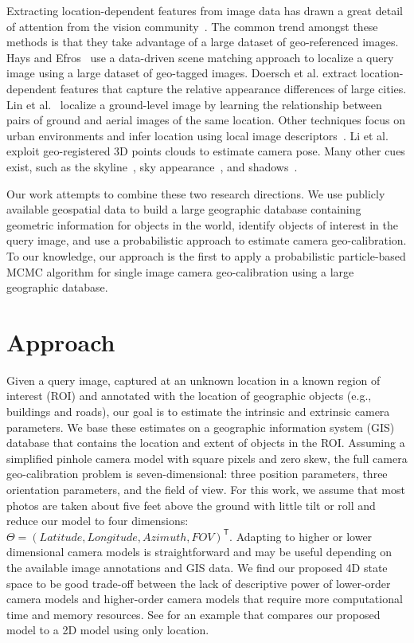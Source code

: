 Extracting location-dependent features from image data has drawn a
great detail of attention from the vision
community~\cite{jacobs07geolocate, jacobs11geolocate,
jacobs08geoorient}. The common trend amongst these methods is that
they take advantage of a large dataset of geo-referenced images. Hays
and Efros~\cite{hays2008im2gps} use a data-driven scene matching
approach to localize a query image using a large dataset of geo-tagged
images.  Doersch et al. extract location-dependent features that
capture the relative appearance differences of large cities.  Lin et
al.~\cite{lin2013cross} localize a ground-level image by learning the
relationship between pairs of ground and aerial images of the same
location. Other techniques focus on urban environments and infer
location using local image
descriptors~\cite{schindler2008detecting,snavely2006photo}. Li et
al.~\cite{li2012worldwide} exploit geo-registered 3D points clouds to
estimate camera pose. Many other cues exist, such as the
skyline~\cite{baatz2012large,ramalingam2009geolocalization}, sky
appearance~\cite{lalonde2010sun,workman2014rainbow}, and
shadows~\cite{junejo2008estimating,wu2010geo}.

Our work attempts to combine these two research directions. We use
publicly available geospatial data to build a large geographic
database containing geometric information for objects in the world,
identify objects of interest in the query image, and use a
probabilistic approach to estimate camera geo-calibration. To our
knowledge, our approach is the first to apply a probabilistic
particle-based MCMC algorithm for single image camera geo-calibration
using a large geographic database. 


\section{Approach}

Given a query image, captured at an unknown location in a known region
of interest (ROI) and annotated with the location of geographic objects
(e.g., buildings and roads), our goal is to estimate the intrinsic and
extrinsic camera parameters.  We base these estimates on a geographic
information system (GIS) database that contains the location and
extent of objects in the ROI.  Assuming a simplified
pinhole camera model
with square pixels and zero skew, the full camera geo-calibration
problem is seven-dimensional: three position parameters, three
orientation parameters, and the field of view. For this work, we
assume that most photos are taken about five feet above the ground
with little tilt or roll and reduce our model to four dimensions:
$\Theta = (Latitude, Longitude, Azimuth, FOV)^\mathsf{T}$. 
%
Adapting to higher or lower dimensional camera models is
straightforward and may be useful depending on the available image
annotations and GIS data.  We find our proposed 4D state space to be
good trade-off between the lack of descriptive power of lower-order
camera models and higher-order camera models that require more
computational time and memory resources. See  for an
example that compares our proposed model to a 2D model using only
location.

